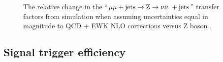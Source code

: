\begin{figure}[!h]
{  } \\
   ~
   \\
  \caption{\label{fig:tfSyst_nlo_mmZinv} The relative change in the
    ``$\mu\mu + \textrm{jets} \rightarrow {\text Z} \rightarrow \nu\bar{\nu}\ + \textrm{jets}$'' transfer factors from
    simulation when assuming uncertainties equal in magnitude to QCD +
    EWK NLO corrections versus Z boson \Pt.  }
\end{figure}

\clearpage
\subsection{Signal trigger efficiency}

